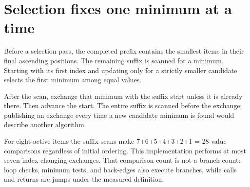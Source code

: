 \section{Selection fixes one minimum at a
  time}\label{009-sorting-visualizer-p07-selection-fixes-one-minimum-at-a-time}

Before a selection pass, the completed prefix contains the smallest
items in their final ascending positions. The remaining suffix is
scanned for a minimum. Starting with its first index and updating only
for a strictly smaller candidate selects the first minimum among equal
values.

After the scan, exchange that minimum with the suffix start unless it is
already there. Then advance the start. The entire suffix is scanned
before the exchange; publishing an exchange every time a new candidate
minimum is found would describe another algorithm.

For eight active items the suffix scans make 7+6+5+4+3+2+1 = 28 value
comparisons regardless of initial ordering. This implementation performs
at most seven index-changing exchanges. That comparison count is not a
branch count: loop checks, minimum tests, and back-edges also execute
branches, while calls and returns are jumps under the measured
definition.
